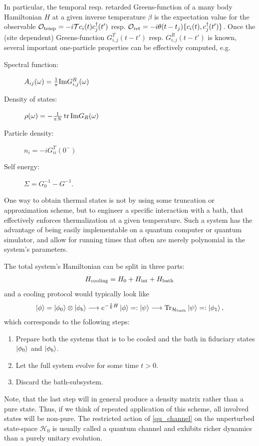 \documentclass[11pt,a4paper]{article}
\newcommand{\tr}{\operatorname{tr}}
\newcommand{\Tr}{\operatorname{Tr}}
\begin{document}
In particular, the temporal resp. retarded Greens-function of a many body Hamiltonian $H$ at a given inverse temperature $\beta$ is the expectation value for the observable $\mathcal{O}_{\rm temp}= -i \mathcal{T} c_i(t) c_j^{\dagger}(t') $ resp. $\mathcal{O}_{\rm ret}=-i \theta(t-t_j)\{c_i(t), c_j^{\dagger}(t')\}$. Once the (site dependent) Greens-function $G_{i,j}^T(t-t')$ resp. $G_{i,j}^R(t-t')$ is known, several important one-particle properties can be effectively computed, e.g.
\begin{description}
    \item[Spectral function:] $A_{ij}(\omega)=\frac{1}{\pi} {\rm Im } G_{i,j}^R(\omega)$ 
    \item[Density of states:] $\rho(\omega) = -\frac{1}{\pi N}   \tr {\rm Im }  G_R(\omega)$
    \item[Particle density:] $n_i = - i G_{ii}^T(0^-)$
    \item[Self energy:] $\Sigma = G_0^{-1}-G^{-1}$.
\end{description}

One way to obtain thermal states is not by using some truncation or approximation scheme, but to engineer a specific interaction with a bath, that effectively enforces thermalization at a given temperature. Such a system has the advantage of being easily implementable on a quantum computer or quantum simulator, and allow for running times that often are merely polynomial in the system's parameters. 

The total system's Hamiltonian can be split in three parts:
\begin{align}\label{hamiltonian_parts}
    H_{\rm cooling} = H_0 + H_{\rm int} + H_{\rm bath} 
\end{align}
and a cooling protocol would typically look like
\begin{align}\label{qu_channel}
\ket{\phi}=\ket{\phi_0}\otimes\ket{\phi_b} \longrightarrow e^{-\frac{t}{\hbar} H}\ket{\phi}  =: \ket{\psi } \longrightarrow \Tr_{\mathcal H_{\rm bath}} \ket{\psi}  =: \ket{\phi_1},
\end{align}
which corresponds to the following steps:
\begin{enumerate}
    \item Prepare both the systems that is to be cooled and the bath in fiduciary states $\ket{\phi_0}$ and $\ket{\phi_b}$.
    \item  Let the full system evolve for some time $t>0$.
    \item Discard the bath-subsystem.
\end{enumerate}
Note, that the last step will in general produce a density matrix rather than a pure state. Thus, if we think of repeated application of this scheme, all involved states will be non-pure. The restricted action of \autoref{qu_channel} on the unperturbed state-space $\mathcal{H}_0$ is usually called a quantum channel and exhibits richer dynamics than a purely unitary evolution. 
\end{document}
